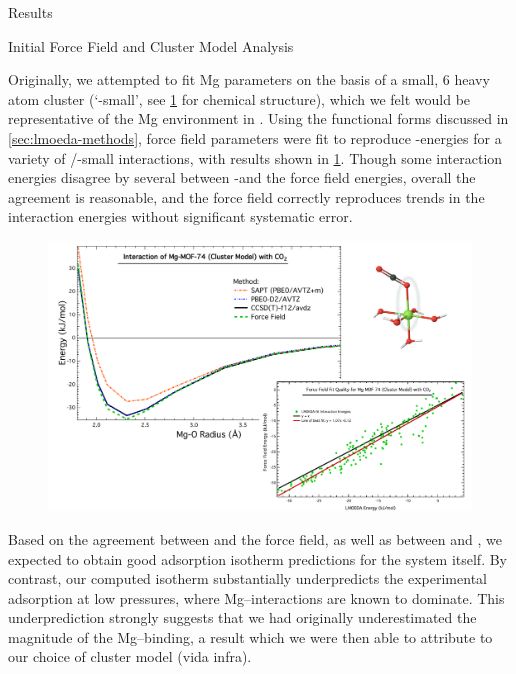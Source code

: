 \begin{section}{Results}
\label{sec:lmoeda-mgmof}

\begin{subsection}{Initial Force Field and Cluster Model Analysis}

Originally, we attempted to fit Mg parameters on the basis of a small, 6 heavy
atom cluster (`\mgmof-small', see \cref{fig:lmoeda-small_fit} for
chemical structure), which we felt would be
representative of the Mg environment in \mgmof. Using the functional forms
discussed in \cref{sec:lmoeda-methods}, force field parameters were fit to
reproduce \lmoeda-\pbeod energies for a variety of \co/\mgmof-small
interactions, with results shown in \cref{fig:lmoeda-small_fit}.
Though some interaction energies disagree by several \kjmol{} between
\lmoeda-\pbeod and the force field energies, overall the agreement is
reasonable, and the force field correctly reproduces trends in the interaction
energies without significant systematic error. 


    \begin{figure}
    \centering
    \includegraphics[width=1.0\textwidth]{lmoeda/small_energies.pdf}
    \caption[Model clusters for \mgmof]
{
            }
    \label{fig:lmoeda-small_fit}
    \end{figure}


Based on the agreement between
\pbeod and the force field, as well as between \pbeod and \ccsdtf, we expected
to obtain good \co adsorption isotherm predictions for the \mgmof system
itself. By contrast, our computed isotherm substantially underpredicts the
experimental adsorption at low pressures, where Mg--\co interactions are known
to dominate. This underprediction strongly suggests that we had originally
underestimated the magnitude of the Mg--\co binding, a result which we were
then able to attribute to our choice of cluster model (vida infra).


\end{subsection}
\end{section}
